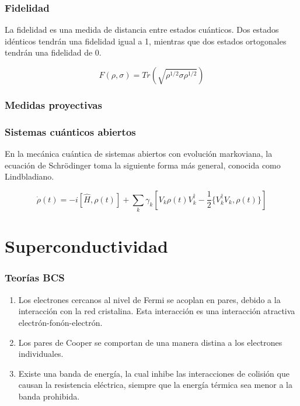 \documentclass[xetex,mathserif,serif]{beamer}
\begin{document}
    \begin{frame}
        \frametitle{Fidelidad}

        La fidelidad es una medida de distancia entre estados cuánticos. Dos estados idénticos tendrán una fidelidad igual a 1, mientras que dos estados ortogonales tendrán una fidelidad de 0.

        \begin{equation}
            F(\rho, \sigma) = Tr(\sqrt{\rho^{1/2} \sigma \rho^{1/2}})
        \end{equation}

    \end{frame}

    \begin{frame}
        \frametitle{Medidas proyectivas}

    \end{frame}

    \begin{frame}
        \frametitle{Sistemas cuánticos abiertos}

        En la mecánica cuántica de sistemas abiertos con evolución markoviana, la ecuación de Schrödinger toma la siguiente forma más general, conocida como Lindbladiano.

        \begin{equation}
            \dot{\rho}(t) = -i [\hat{H}, \rho(t)] + \sum_k \gamma_k [V_k \rho(t) V_k^\dagger - \frac{1}{2} \{V_k^\dagger V_k, \rho(t)\}]
        \end{equation}

    \end{frame}

\section{Superconductividad}

\begin{frame}
    \frametitle{Teorías BCS}

    \begin{enumerate}
        \item Los electrones cercanos al nivel de Fermi se acoplan en pares, debido a la interacción con la red cristalina. Esta interacción es una interacción atractiva electrón-fonón-electrón.
        \item Los pares de Cooper se comportan de una manera distina a los electrones individuales.
        \item Existe una banda de energía, la cual inhibe las interacciones de colisión que causan la resistencia eléctrica, siempre que la energía térmica sea menor a la banda prohibida.
    \end{enumerate}

\end{frame}
\end{document}
